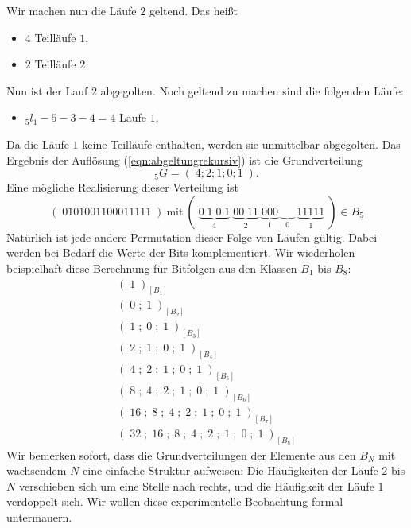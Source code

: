 \documentclass[11pt,a4paper]{scrartcl}
\theoremstyle{plain}
\theoremstyle{definition}
\theoremstyle{remark}
\begin{document}
Wir machen nun die Läufe $2$ geltend. Das heißt
\begin{itemize}
  \item $4$ Teilläufe $1$,
  \item $2$ Teilläufe $2$.
\end{itemize}
Nun ist der Lauf $2$ abgegolten. Noch geltend zu machen sind die
folgenden Läufe:
\begin{itemize}
  \item $_5l_1-5-3-4=4$ Läufe $1$.
\end{itemize}
Da die Läufe $1$ keine Teilläufe enthalten, werden sie unmittelbar
abgegolten. Das Ergebnis der Auflösung (\ref{eqn:abgeltungrekursiv}) ist
die Grundverteilung
\begin{equation}
  _5G=(\;4;2;1;0;1\;).
\end{equation}
Eine mögliche Realisierung dieser Verteilung ist
\begin{equation}\label{eqn:folfgeausb5}
  (\;0101001100011111\;)\ \text{mit}\
  (\;\underbrace{ 0\; 1\; 0\; 1}_{4}\;
   \underbrace{00\; 11}_{2}\;
   \underbrace{000}_{1}\;
   \underbrace{\;\;\;\;}_{0}\;
   \underbrace{11111}_{1}\; )\in B_5
\end{equation}
Natürlich ist jede andere Permutation dieser Folge von Läufen gültig.
Dabei werden bei Bedarf die Werte der Bits komplementiert. Wir
wiederholen beispielhaft diese Berechnung für Bitfolgen aus den Klassen
$B_1$ bis $B_8$:
\begin{align}
  (\;1\;)_{[B_1]}\label{eqn:folfgeausb1}\\
  (\;0\;;\;1\;)_{[B_2]}\nonumber\\
  (\;1\;;\;0\;;\;1\;)_{[B_3]}\nonumber\\
  (\;2\;;\;1\;;\;0\;;\;1\;)_{[B_4]}\nonumber\\
  (\;4\;;\;2\;;\;1\;;\;0\;;\;1\;)_{[B_5]}\nonumber\\
  (\;8\;;\;4\;;\;2\;;\;1\;;\;0\;;\;1\;)_{[B_6]}\nonumber\\
  (\;16\;;\;8\;;\;4\;;\;2\;;\;1\;;\;0\;;\;1\;)_{[B_7]}\nonumber\\
  (\;32\;;\;16\;;\;8\;;\;4\;;\;2\;;\;1\;;\;0\;;\;1\;)_{[B_8]}
  \label{eqn:folfgeausb8}
\end{align}
Wir bemerken sofort, dass die Grundverteilungen der Elemente aus den
$B_N$ mit wachsendem $N$ eine einfache Struktur aufweisen: Die
Häufigkeiten der Läufe $2$ bis $N$ verschieben sich um eine Stelle nach
rechts, und die Häufigkeit der Läufe $1$ verdoppelt sich. Wir wollen
diese experimentelle Beobachtung formal untermauern.
\end{document}
